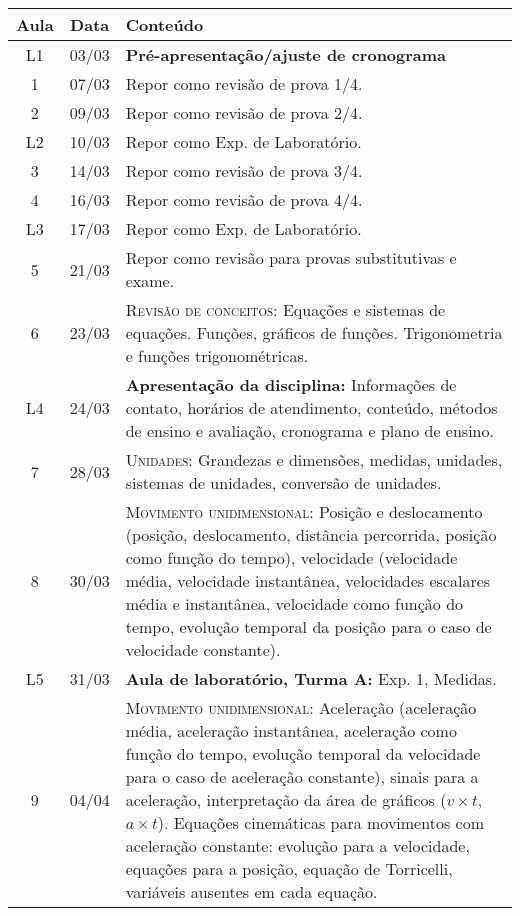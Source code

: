\begin{center}
\begin{longtable}{ccp{70mm}}
\toprule
Aula & Data & Conteúdo \\
\midrule
\endhead
\bottomrule
\endfoot
L1   &  03/03    & 	\textbf{Pré-apresentação/ajuste de cronograma} \\
1	 & 	07/03	 & 	Repor como revisão de prova 1/4. \\
2	 & 	09/03	 & 	Repor como revisão de prova 2/4. \\
L2   &  10/03    &  Repor como Exp. de Laboratório. \\
3	 & 	14/03	 & 	Repor como revisão de prova 3/4. \\
4	 & 	16/03	 & 	Repor como revisão de prova 4/4. \\
L3   &  17/03    &  Repor como Exp. de Laboratório. \\
5	 & 	21/03	 & 	Repor como revisão para provas substitutivas e exame. \\
6	 & 	23/03	 & 	\textsc{Revisão de conceitos:} Equações e sistemas de equações. Funções, gráficos de funções. Trigonometria e funções trigonométricas. \\
L4   &  24/03    &  \textbf{Apresentação da disciplina:} Informações de contato, horários de atendimento, conteúdo, métodos de ensino e avaliação, cronograma e plano de ensino.\\
7	 & 	28/03	 & 	\textsc{Unidades:} Grandezas e dimensões, medidas, unidades, sistemas de unidades, conversão de unidades. \\
8	 & 	30/03	 & 	\textsc{Movimento unidimensional:} Posição e deslocamento (posição, deslocamento, distância percorrida, posição como função do tempo), velocidade (velocidade média, velocidade instantânea, velocidades escalares média e instantânea, velocidade como função do tempo, evolução temporal da posição para o caso de velocidade constante).\\
L5   &  31/03    &  \textbf{Aula de laboratório, Turma A:} Exp. 1, Medidas.\\
9	 & 	04/04	 & 	\textsc{Movimento unidimensional:} Aceleração (aceleração média, aceleração instantânea, aceleração como função do tempo, evolução temporal da velocidade para o caso de aceleração constante), sinais para a aceleração, interpretação da área de gráficos ($v \times t$, $a \times  t$). Equações cinemáticas para movimentos com aceleração constante: evolução para a velocidade, equações para a posição, equação de Torricelli, variáveis ausentes em cada equação.\\

\end{longtable}
\end{center}
